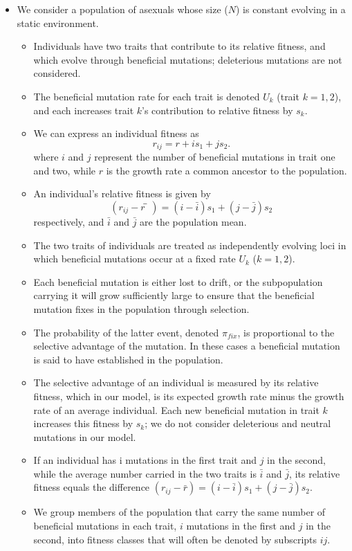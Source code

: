 \documentclass[12pt,one column]{article}
\begin{document}
\begin{itemize}
	\item We consider a population of asexuals whose size ($N$) is constant evolving in a static environment.
	\begin{itemize}
		\item Individuals have two traits that contribute to its relative fitness, and which evolve through beneficial mutations; deleterious mutations are not considered.
		\item The beneficial mutation rate for each trait is denoted $U_k$ (trait $k=1,2$), and each increases trait $k$’s contribution to relative fitness by $s_k$.  
		\item We can express an individual fitness as \[ r_{ij}=r+i s_1+j s_2. \] where $i$ and $j$ represent the number of beneficial mutations in trait one and two, while $r$ is the growth rate a common ancestor to the population. 
		\item An individual’s relative fitness is given by \[ (r_{ij}-r ̅)=(i-\bar{i} ) s_1+(j-\bar{j} ) s_2 \] respectively, and $\bar{i}$ and $\bar{j}$ are the population mean.  
		\item The two traits of individuals are treated as independently evolving loci in which beneficial mutations occur at a fixed rate $U_k$ ($k=1,2$).  
		\item Each beneficial mutation is either lost to drift, or the subpopulation carrying it will grow sufficiently large to ensure that the beneficial mutation fixes in the population through selection. 
		\item The probability of the latter event, denoted $\pi_{fix}$, is proportional to the selective advantage of the mutation. In these cases a beneficial mutation is said to have established in the population. 
		\item The selective advantage of an individual is measured by its relative fitness, which in our model, is its expected growth rate minus the growth rate of an average individual. Each new beneficial mutation in trait $k$ increases this fitness by $s_k$; we do not consider deleterious and neutral mutations in our model. 
		\item If an individual has i mutations in the first trait and $j$ in the second, while the average number carried in the two traits is $\bar{i}$ and $\bar{j}$, its relative fitness equals the difference $(r_{ij}-\bar{r})=(i-\bar{i}) s_1+(j-\bar{j}) s_2$. 
		\item We group members of the population that carry the same number of beneficial mutations in each trait, $i$ mutations in the first and $j$ in the second, into fitness classes that will often be denoted by subscripts $ij$. 

\end{itemize}
\end{itemize}
\end{document}

